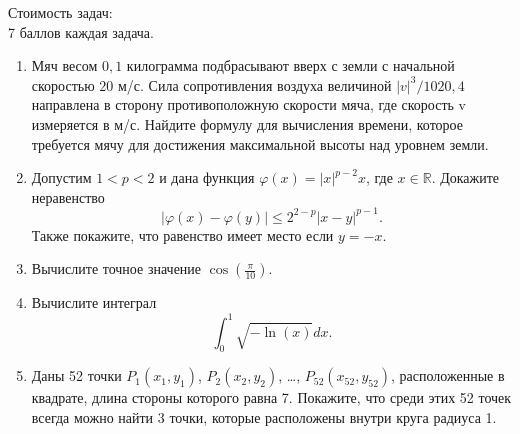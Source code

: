 \begin{flushright}
Стоимость задач: \\
7 баллов каждая задача.\\
\end{flushright}

\begin{enumerate}
\item Мяч весом $0,1$ килограмма подбрасывают вверх с земли с начальной скоростью $20$ м/с. Сила сопротивления воздуха величиной $|v|^3/1020,4$ направлена в сторону противоположную скорости мяча, где скорость v измеряется в м/с. Найдите формулу для вычисления времени, которое требуется мячу для достижения максимальной высоты над уровнем земли. 

\item Допустим $1 < p < 2$ и дана функция $\varphi(x) = |x|^{p-2} x$, где $x \in \mathbb{R}$. Докажите неравенство
$$|\varphi(x) - \varphi(y)| \leqslant 2^{2-p} |x-y|^{p-1}.$$
Также покажите, что равенство имеет место если $y = -x$.

\item Вычислите точное значение $\cos\left(\frac{\pi}{10}\right)$.

\item Вычислите интеграл
$$\int_{0}^{1} \sqrt{-\ln(x)} dx.$$

\item Даны 52 точки $P_1(x_1, y_1)$, $P_2(x_2, y_2)$, \ldots, $P_{52}(x_{52}, y_{52})$, расположенные в квадрате, длина стороны которого равна 7. Покажите, что среди этих 52 точек всегда можно найти 3 точки,
которые расположены внутри круга радиуса 1.
\end{enumerate}